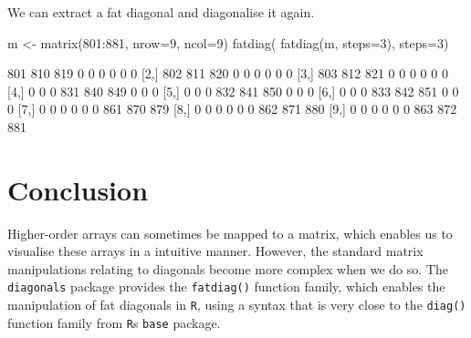 \documentclass[article]{jss}
\begin{document}
We can extract a fat diagonal and diagonalise it again.

\begin{CodeChunk}
\begin{CodeInput}
m <- matrix(801:881, nrow=9, ncol=9)
fatdiag( fatdiag(m, steps=3), steps=3)
\end{CodeInput}
\begin{CodeOutput}
      [,1] [,2] [,3] [,4] [,5] [,6] [,7] [,8] [,9]
 [1,]  801  810  819    0    0    0    0    0    0
 [2,]  802  811  820    0    0    0    0    0    0
 [3,]  803  812  821    0    0    0    0    0    0
 [4,]    0    0    0  831  840  849    0    0    0
 [5,]    0    0    0  832  841  850    0    0    0
 [6,]    0    0    0  833  842  851    0    0    0
 [7,]    0    0    0    0    0    0  861  870  879
 [8,]    0    0    0    0    0    0  862  871  880
 [9,]    0    0    0    0    0    0  863  872  881
\end{CodeOutput}
\end{CodeChunk}

\section{Conclusion}\label{conclusion}

Higher-order arrays can sometimes be mapped to a matrix, which enables
us to visualise these arrays in a intuitive manner. However, the
standard matrix manipulations relating to diagonals become more complex
when we do so. The \texttt{diagonals} package provides the
\texttt{fatdiag()} function family, which enables the manipulation of
fat diagonals in \texttt{R}, using a syntax that is very close to the
\texttt{diag()} function family from \texttt{R}s \texttt{base} package.
\end{document}
